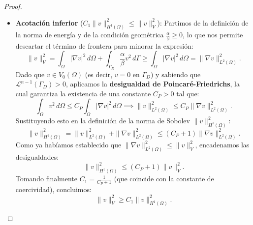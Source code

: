 \documentclass[11pt]{book}
\theoremstyle{plain} %
\theoremstyle{definition} %
\theoremstyle{definition} %
\begin{document}
\begin{proof}
\begin{itemize}
        \item \textbf{Acotación inferior} ($C_1 \|v\|_{H^1(\Omega)}^2 \leq \|v\|_{V}^2$): Partimos de la definición de la norma de energía y de la condición geométrica $\frac{\alpha}{\beta} \geq 0$, lo que nos permite descartar el término de frontera para minorar la expresión:
        \begin{equation*}
            \|v\|_{V}^2 = \int_{\Omega} |\nabla v|^2 \, d\Omega + \int_{\Gamma_R} \frac{\alpha}{\beta} v^2 \, d\Gamma \geq \int_{\Omega} |\nabla v|^2 \, d\Omega = \|\nabla v\|_{L^2(\Omega)}^2.
        \end{equation*}
        Dado que $v \in V_0(\Omega)$ (es decir, $v=0$ en $\Gamma_D$) y sabiendo que $\mathcal{L}^{n-1}(\Gamma_D) > 0$, aplicamos la \textbf{desigualdad de Poincaré-Friedrichs}, la cual garantiza la existencia de una constante $C_P > 0$ tal que:
        \begin{equation*}
            \int_{\Omega} v^2 \, d\Omega \leq C_P \int_{\Omega} |\nabla v|^2 \, d\Omega \implies \|v\|_{L^2(\Omega)}^2 \leq C_P \|\nabla v\|_{L^2(\Omega)}^2.
        \end{equation*}
        Sustituyendo esto en la definición de la norma de Sobolev $\|v\|_{H^1(\Omega)}^2$:
        \begin{equation*}
            \|v\|_{H^1(\Omega)}^2 = \|v\|_{L^2(\Omega)}^2 + \|\nabla v\|_{L^2(\Omega)}^2 \leq (C_P + 1) \|\nabla v\|_{L^2(\Omega)}^2.
        \end{equation*} 
        Como ya habíamos establecido que $\|\nabla v\|_{L^2(\Omega)}^2 \leq \|v\|_V^2$, encadenamos las desigualdades:
        \begin{equation*}
           \|v\|_{H^1(\Omega)}^2 \leq (C_P + 1) \|v\|_{V}^2.
        \end{equation*}
        Tomando finalmente $C_1 = \frac{1}{C_P + 1}$ (que coincide con la constante de coercividad), concluimos:
        \begin{equation*}
            \|v\|_{V}^2 \geq C_1\|v\|^2_{H^1(\Omega)}.
        \end{equation*}
    \end{itemize}
\end{proof}
\end{document}
